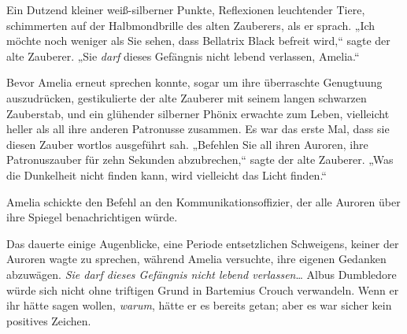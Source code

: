 Ein Dutzend kleiner weiß-silberner Punkte, Reflexionen leuchtender Tiere, schimmerten auf der Halbmondbrille des alten Zauberers, als er sprach. „Ich möchte noch weniger als Sie sehen, dass Bellatrix Black befreit wird,“ sagte der alte Zauberer. „Sie \emph{darf} dieses Gefängnis nicht lebend verlassen, Amelia.“

Bevor Amelia erneut sprechen konnte, sogar um ihre überraschte Genugtuung auszudrücken, gestikulierte der alte Zauberer mit seinem langen schwarzen Zauberstab, und ein glühender silberner Phönix erwachte zum Leben, vielleicht heller als all ihre anderen Patronusse zusammen. Es war das erste Mal, dass sie diesen Zauber wortlos ausgeführt sah. „Befehlen Sie all ihren Auroren, ihre Patronuszauber für zehn Sekunden abzubrechen,“ sagte der alte Zauberer. „Was die Dunkelheit nicht finden kann, wird vielleicht das Licht finden.“

Amelia schickte den Befehl an den Kommunikationsoffizier, der alle Auroren über ihre Spiegel benachrichtigen würde.

Das dauerte einige Augenblicke, eine Periode entsetzlichen Schweigens, keiner der Auroren wagte zu sprechen, während Amelia versuchte, ihre eigenen Gedanken abzuwägen. \emph{Sie darf dieses Gefängnis nicht lebend verlassen}… Albus Dumbledore würde sich nicht ohne triftigen Grund in Bartemius Crouch verwandeln. Wenn er ihr hätte sagen wollen, \emph{warum}, hätte er es bereits getan; aber es war sicher kein positives Zeichen.

